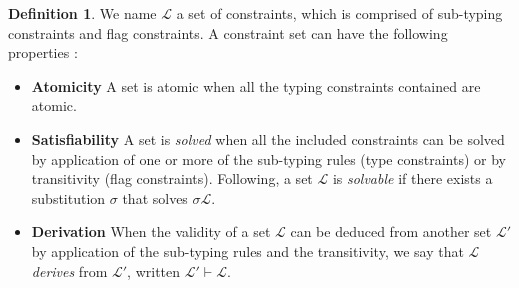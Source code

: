 \documentclass[10pt]{article}
\theoremstyle{plain}
\theoremstyle{definition}
\newtheorem{defn}{Definition}[subsection] %
\begin{document}
\begin{defn} We name $\mathcal{L}$ a set of constraints, which is comprised of sub-typing constraints
  and flag constraints. A constraint set can have the following properties :
  \begin{itemize}
  	\item[]{\bf Atomicity} A set is atomic when all the typing constraints contained are atomic.
  	\item[]{\bf Satisfiability} A set is \textit{solved} when all the included constraints can be solved by application of one or
  		more of the sub-typing rules (type constraints) or by transitivity (flag constraints).
  		Following, a set $\mathcal{L}$ is \textit{solvable} if there exists a substitution $\sigma$ that solves $\sigma \mathcal{L}$.
	 	\item[]{\bf Derivation} When the validity of a set $\mathcal{L}$ can be deduced from another set $\mathcal{L'}$ by application of
		  the sub-typing rules and the transitivity, we say that $\mathcal{L}$ \textit{derives} from $\mathcal{L'}$,
		  written $\mathcal{L'} \vdash \mathcal{L}$.
  \end{itemize}
\end{defn}
\end{document}
